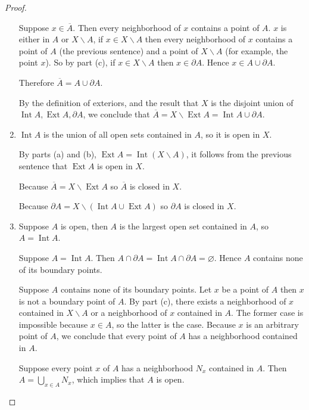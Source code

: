 \begin{proof}
\begin{enumerate}[label={(\alph*)}]
		      Suppose $x\in\overline{A}$. Then every neighborhood of $x$ contains a point of $A$. $x$ is either in $A$ or $X\smallsetminus A$, if $x\in X\smallsetminus A$ then every neighborhood of $x$ contains a point of $A$ (the previous sentence) and a point of $X\smallsetminus A$ (for example, the point $x$). So by part (c), if $x\in X\smallsetminus A$ then $x\in\partial A$. Hence $x\in A\cup\partial A$.

		      Therefore $\overline{A} = A\cup\partial A$.

		      By the definition of exteriors, and the result that $X$ is the disjoint union of $\operatorname{Int}A, \operatorname{Ext}A, \partial A$, we conclude that $\overline{A} = X\smallsetminus \operatorname{Ext} A = \operatorname{Int} A\cup \partial A$.

		\item $\operatorname{Int} A$ is the union of all open sets contained in $A$, so it is open in $X$.

		      By parts (a) and (b), $\operatorname{Ext} A = \operatorname{Int} (X\smallsetminus A)$, it follows from the previous sentence that $\operatorname{Ext} A$ is open in $X$.

		      Because $\overline{A} = X\smallsetminus\operatorname{Ext} A$ so $\overline{A}$ is closed in $X$.

		      Because $\partial A = X\smallsetminus (\operatorname{Int} A \cup \operatorname{Ext} A)$ so $\partial A$ is closed in $X$.

		\item Suppose $A$ is open, then $A$ is the largest open set contained in $A$, so $A = \operatorname{Int} A$.

		      Suppose $A = \operatorname{Int} A$. Then $A\cap \partial A = \operatorname{Int} A \cap \partial A = \varnothing$. Hence $A$ contains none of its boundary points.

		      Suppose $A$ contains none of its boundary points. Let $x$ be a point of $A$ then $x$ is not a boundary point of $A$. By part (c), there exists a neighborhood of $x$ contained in $X\smallsetminus A$ or a neighborhood of $x$ contained in $A$. The former case is impossible because $x\in A$, so the latter is the case. Because $x$ is an arbitrary point of $A$, we conclude that every point of $A$ has a neighborhood contained in $A$.

		      Suppose every point $x$ of $A$ has a neighborhood $N_{x}$ contained in $A$. Then $A = \bigcup_{x\in A}N_{x}$, which implies that $A$ is open.


\end{enumerate}
\end{proof}
